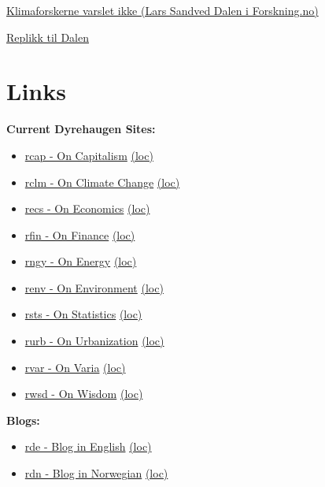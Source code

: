 \documentclass[
]{book}
\providecommand{\tightlist}{%
  \setlength{\itemsep}{0pt}\setlength{\parskip}{0pt}}
\begin{document}
\href{https://forskning.no/media/hvorfor-varslet-ikke-norske-forskere-om-klimaendringene-tidligere/1795682}{Klimaforskerne varslet ikke (Lars Sandved Dalen i Forskning.no)}

\href{https://forskersonen.no/klima-kronikk-meninger/hvor-skrasikre-kunne-forskerne-egentlig-vaere-om-klimaendringene-for-90-tallet/1802246}{Replikk til Dalen}

\hypertarget{links}{%
\chapter{Links}\label{links}}

\textbf{Current Dyrehaugen Sites:}

\begin{itemize}
\tightlist
\item
  \href{https://dyrehaugen.github.io/rcap}{rcap - On Capitalism} \href{http://localhost/rcap}{(loc)}
\item
  \href{https://dyrehaugen.github.io/rclm}{rclm - On Climate Change} \href{http://localhost/rclm}{(loc)}
\item
  \href{https://dyrehaugen.github.io/recs}{recs - On Economics} \href{http://localhost/recs}{(loc)}
\item
  \href{https://dyrehaugen.github.io/rngy}{rfin - On Finance} \href{http://localhost/rfin}{(loc)}
\item
  \href{https://dyrehaugen.github.io/rngy}{rngy - On Energy} \href{http://localhost/rngy}{(loc)}
\item
  \href{https://dyrehaugen.github.io/renv}{renv - On Environment} \href{http://localhost/renv}{(loc)}
\item
  \href{https://dyrehaugen.github.io/rsts}{rsts - On Statistics} \href{http://localhost/rsts}{(loc)}
\item
  \href{https://dyrehaugen.github.io/rurb}{rurb - On Urbanization} \href{http://localhost/rurb}{(loc)}
\item
  \href{https://dyrehaugen.github.io/rvar}{rvar - On Varia} \href{http://localhost/rvar}{(loc)}
\item
  \href{https://dyrehaugen.github.io/rwsd}{rwsd - On Wisdom} \href{http://localhost/rwsd}{(loc)}
\end{itemize}

\textbf{Blogs:}

\begin{itemize}
\tightlist
\item
  \href{https://dyrehaugen.github.io/rde}{rde - Blog in English} \href{http://localhost/rde}{(loc)}
\item
  \href{https://dyrehaugen.github.io/rdn}{rdn - Blog in Norwegian} \href{http://localhost/rdn}{(loc)}
\end{itemize}
\end{document}
